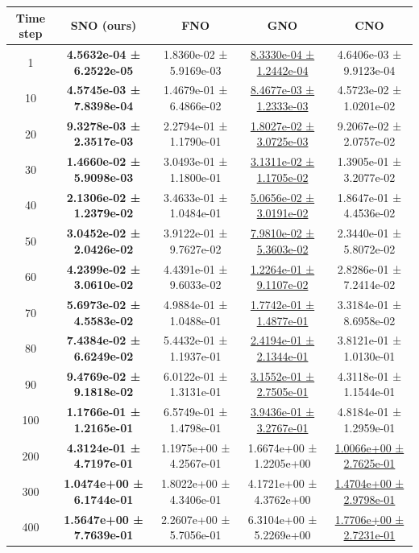 \documentclass{article}
\theoremstyle{plain}
\theoremstyle{definition}
\theoremstyle{remark}
\begin{document}
\begin{table}[htbp]
\centering
\small
\setlength{\tabcolsep}{6pt}
\begin{tabular}{ccccc}
\hline
Time step & SNO (ours) & FNO & GNO & CNO \\
\hline
1   & \textbf{4.5632e-04 ± 6.2522e-05} & 1.8360e-02 ± 5.9169e-03 & \underline{8.3330e-04 ± 1.2442e-04} & 4.6406e-03 ± 9.9123e-04 \\
10  & \textbf{4.5745e-03 ± 7.8398e-04} & 1.4679e-01 ± 6.4866e-02 & \underline{8.4677e-03 ± 1.2333e-03} & 4.5723e-02 ± 1.0201e-02 \\
20  & \textbf{9.3278e-03 ± 2.3517e-03} & 2.2794e-01 ± 1.1790e-01 & \underline{1.8027e-02 ± 3.0725e-03} & 9.2067e-02 ± 2.0757e-02 \\
30  & \textbf{1.4660e-02 ± 5.9098e-03} & 3.0493e-01 ± 1.1800e-01 & \underline{3.1311e-02 ± 1.1705e-02} & 1.3905e-01 ± 3.2077e-02 \\
40  & \textbf{2.1306e-02 ± 1.2379e-02} & 3.4633e-01 ± 1.0484e-01 & \underline{5.0656e-02 ± 3.0191e-02} & 1.8647e-01 ± 4.4536e-02 \\
50  & \textbf{3.0452e-02 ± 2.0426e-02} & 3.9122e-01 ± 9.7627e-02 & \underline{7.9810e-02 ± 5.3603e-02} & 2.3440e-01 ± 5.8072e-02 \\
60  & \textbf{4.2399e-02 ± 3.0610e-02} & 4.4391e-01 ± 9.6033e-02 & \underline{1.2264e-01 ± 9.1107e-02} & 2.8286e-01 ± 7.2414e-02 \\
70  & \textbf{5.6973e-02 ± 4.5583e-02} & 4.9884e-01 ± 1.0488e-01 & \underline{1.7742e-01 ± 1.4877e-01} & 3.3184e-01 ± 8.6958e-02 \\
80  & \textbf{7.4384e-02 ± 6.6249e-02} & 5.4432e-01 ± 1.1937e-01 & \underline{2.4194e-01 ± 2.1344e-01} & 3.8121e-01 ± 1.0130e-01 \\
90  & \textbf{9.4769e-02 ± 9.1818e-02} & 6.0122e-01 ± 1.3131e-01 & \underline{3.1552e-01 ± 2.7505e-01} & 4.3118e-01 ± 1.1544e-01 \\
100 & \textbf{1.1766e-01 ± 1.2165e-01} & 6.5749e-01 ± 1.4798e-01 & \underline{3.9436e-01 ± 3.2767e-01} & 4.8184e-01 ± 1.2959e-01 \\
200 & \textbf{4.3124e-01 ± 4.7197e-01} & 1.1975e+00 ± 4.2567e-01 & 1.6674e+00 ± 1.2205e+00 & \underline{1.0066e+00 ± 2.7625e-01} \\
300 & \textbf{1.0474e+00 ± 6.1744e-01} & 1.8022e+00 ± 4.3406e-01 & 4.1721e+00 ± 4.3762e+00 & \underline{1.4704e+00 ± 2.9798e-01} \\
400 & \textbf{1.5647e+00 ± 7.7639e-01} & 2.2607e+00 ± 5.7056e-01 & 6.3104e+00 ± 5.2269e+00 & \underline{1.7706e+00 ± 2.7231e-01} \\

\end{tabular}
\end{table}
\end{document}
